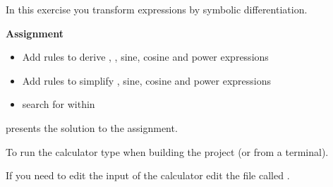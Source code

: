 In this exercise you transform expressions by symbolic differentiation.

{\bf Assignment}

\begin{itemize}
\item Add rules to derive , , sine, cosine and power expressions
\item Add rules to simplify , sine, cosine and power expressions
\item search for  within 
\end{itemize}

 presents the solution to the assignment.

To run the calculator type  when building the project (or  from a terminal).

If you need to edit the input of the calculator edit the file called .
